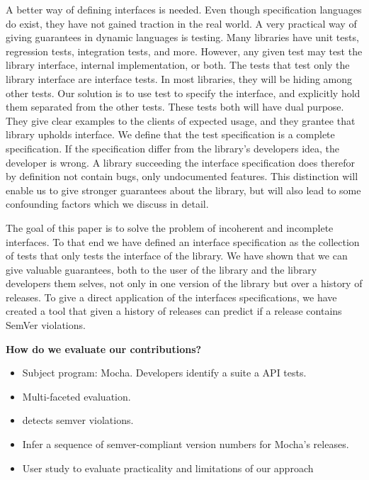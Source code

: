 A better way of defining interfaces is needed. Even though specification
languages do exist, they have not gained traction in the real world. A very
practical way of giving guarantees in dynamic languages is testing.  Many
libraries have unit tests, regression tests, integration tests, and more.
However, any given test may test the library interface, internal
implementation, or both.  The tests that test only the library interface are
interface tests. In most libraries, they will be hiding among other tests.  Our
solution is to use test to specify the interface, and explicitly hold them
separated from the other tests. These tests both will have dual purpose. They
give clear examples to the clients of expected usage, and they grantee that
library upholds interface. We define that the test specification is a complete
specification. If the specification differ from the library's developers idea,
the developer is wrong.  A library succeeding the interface specification does
therefor by definition not contain bugs, only undocumented features. This
distinction will enable us to give stronger guarantees about the library, but
will also lead to some confounding factors which we discuss in detail.

The goal of this paper is to solve the problem of incoherent and
incomplete interfaces. To that end we have defined an interface specification
as the collection of tests that only tests the interface of the library. We have
shown that we can give valuable guarantees, both to the user of the library and
the library developers them selves, not only in one version of the library but 
over a history of releases. To give a direct application of the interfaces 
specifications, we have created a tool that given a history of releases can
predict if a release contains SemVer violations. 


{\bf How do we evaluate our contributions?}
\begin{itemize}
\item Subject program: Mocha. Developers identify a suite a API tests.
\item Multi-faceted evaluation.
\item detects semver violations.
\item Infer a sequence of semver-compliant version numbers for Mocha's
  releases.
\item User study to evaluate practicality and limitations of our
  approach
\end{itemize}


